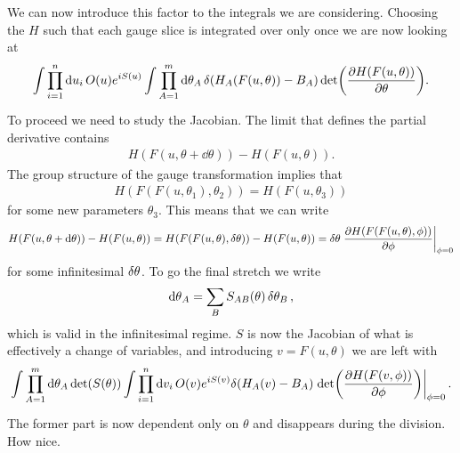 We can now introduce this factor to the integrals we are considering. Choosing the $H$ such that each gauge slice is integrated over only once we are now looking at
\begin{align*}
	\int\limits_{}^{}\prod\limits_{i = 1}^{n}\dd{u_{i}}O(u)e^{iS(u)}\int\limits_{}^{}\prod\limits_{A = 1}^{m}\dd{\theta_{A}}\delta(H_{A}(F(u, \theta)) - B_{A})\det(\pdv{H(F(u, \theta))}{\theta}).
\end{align*}
To proceed we need to study the Jacobian. The limit that defines the partial derivative contains
\begin{align*}
	H(F(u, \theta + \dd{\theta})) - H(F(u, \theta)).
\end{align*}
The group structure of the gauge transformation implies that
\begin{align*}
	H(F(F(u, \theta_{1}), \theta_{2})) = H(F(u, \theta_{3}))
\end{align*}
for some new parameters $\theta_{3}$. This means that we can write
\begin{align*}
	H(F(u, \theta + \dd{\theta})) - H(F(u, \theta)) = H(F(F(u, \theta), \var{\theta})) - H(F(u, \theta)) = \var{\theta}\eval{\pdv{H(F(F(u, \theta), \phi))}{\phi}}_{\phi = 0}
\end{align*}
for some infinitesimal $\var{\theta}$. To go the final stretch we write
\begin{align*}
	\dd{\theta}_{A} = \sum\limits_{B}S_{AB}(\theta)\var{\theta_{B}},
\end{align*}
which is valid in the infinitesimal regime. $S$ is now the Jacobian of what is effectively a change of variables, and introducing $v = F(u, \theta)$ we are left with
\begin{align*}
	\inte{}{}\prod\limits_{A = 1}^{m}\dd{\theta_{A}}\det(S(\theta))\inte{}{}\prod\limits_{i = 1}^{n}\dd{v_{i}}O(v)e^{iS(v)}\delta(H_{A}(v) - B_{A})\eval{\det(\pdv{H(F(v, \phi))}{\phi})}_{\phi = 0}.
\end{align*}
The former part is now dependent only on $\theta$ and disappears during the division. How nice.

